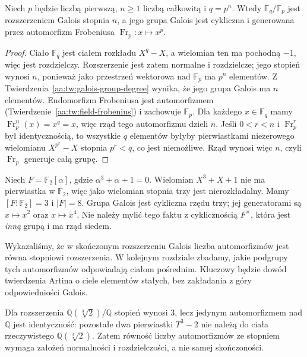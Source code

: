 \begin{twierdzenie}
\label{aa:tw:finite-field-frobenius-group}
Niech $p$ będzie liczbą pierwszą, $n\ge1$ liczbą
całkowitą i $q=p^n$. Wtedy $\mathbb F_q/\mathbb F_p$
jest rozszerzeniem Galois stopnia $n$, a jego grupa
Galois jest cykliczna i generowana przez automorfizm
Frobeniusa $\operatorname{Fr}_p:x\mapsto x^p$.
\end{twierdzenie}
\begin{proof}
Ciało $\mathbb F_q$ jest ciałem rozkładu
$X^q-X$, a wielomian ten ma pochodną $-1$,
więc jest rozdzielczy. Rozszerzenie jest zatem
normalne i rozdzielcze; jego stopień wynosi $n$,
ponieważ jako przestrzeń wektorowa nad $\mathbb F_p$
ma $p^n$ elementów. Z
Twierdzenia~\ref{aa:tw:galois-group-degree} wynika,
że jego grupa Galois ma $n$ elementów.
Endomorfizm Frobeniusa jest automorfizmem
(Twierdzenie~\ref{aa:tw:field-frobenius}) i zachowuje
$\mathbb F_p$. Dla każdego $x\in\mathbb F_q$
mamy $\operatorname{Fr}_p^n(x)=x^q=x$, więc rząd
tego automorfizmu dzieli $n$. Jeśli $0<r<n$
i $\operatorname{Fr}_p^r$ był identycznością,
to wszystkie $q$ elementów byłyby pierwiastkami
niezerowego wielomianu $X^{p^r}-X$ stopnia
$p^r<q$, co jest niemożliwe. Rząd wynosi więc
$n$, czyli $\operatorname{Fr}_p$ generuje całą grupę.
\end{proof}

\begin{przyklad}
\label{aa:prz:eight-field-frobenius}
Niech $F=\mathbb F_2[\alpha]$, gdzie
$\alpha^3+\alpha+1=0$. Wielomian $X^3+X+1$
nie ma pierwiastka w $\mathbb F_2$, więc jako
wielomian stopnia trzy jest nierozkładalny.
Mamy $[F:\mathbb F_2]=3$ i $|F|=8$.
Grupa Galois jest cykliczna rzędu trzy; jej
generatorami są $x\mapsto x^2$ oraz $x\mapsto x^4$.
Nie należy mylić tego faktu z cyklicznością
$F^\times$, która jest \emph{inną} grupą i ma rząd siedem.
\end{przyklad}

\begin{uwaga}
\label{aa:uw:embeddings-next}
Wykazaliśmy, że w skończonym rozszerzeniu Galois
liczba automorfizmów jest równa stopniowi rozszerzenia.
W kolejnym rozdziale zbadamy, jakie podgrupy tych
automorfizmów odpowiadają ciałom pośrednim. Kluczowy
będzie dowód twierdzenia Artina o ciele elementów stałych,
bez zakładania z góry odpowiedniości Galois.
\end{uwaga}

\begin{uwaga}
Dla rozszerzenia $\mathbb Q(\sqrt[3]{2})/\mathbb Q$
stopień wynosi $3$, lecz jedynym automorfizmem nad $\mathbb Q$
jest identyczność: pozostałe dwa pierwiastki $T^3-2$ nie należą
do ciała rzeczywistego $\mathbb Q(\sqrt[3]{2})$.
Zatem równość liczby automorfizmów ze stopniem wymaga
założeń normalności i rozdzielczości, a nie samej skończoności.
\end{uwaga}
